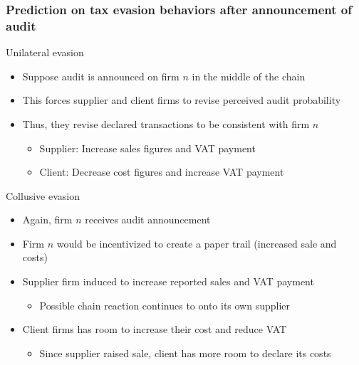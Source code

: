 \documentclass[aspectratio=169]{beamer}
\begin{document}
\begin{frame}
  \frametitle{Prediction on tax evasion behaviors after announcement of audit}
  Unilateral evasion
\begin{itemize}\setlength\itemsep{3pt}
\item Suppose audit is announced on firm $n$ in the middle of the chain
\item This forces supplier and client firms to revise perceived audit probability
\item Thus, they revise declared transactions to be consistent with firm $n$
\begin{itemize}\setlength\itemsep{3pt}
  \item Supplier: Increase sales figures and VAT payment
  \item Client: Decrease cost figures and increase VAT payment
\end{itemize}
\end{itemize}\medskip
Collusive evasion
\begin{itemize}\setlength\itemsep{3pt}
\item Again, firm $n$ receives audit announcement
\item Firm $n$ would be incentivized to create a paper trail (increased sale and costs)
\item Supplier firm induced to increase reported sales and VAT payment 
\begin{itemize}
\item Possible chain reaction continues to onto its own supplier
\end{itemize}
\item Client firms has room to increase their cost and reduce VAT 
\begin{itemize}
\item Since supplier raised sale, client has more room to declare its costs
\end{itemize}
\end{itemize}
\end{frame}
\end{document}
